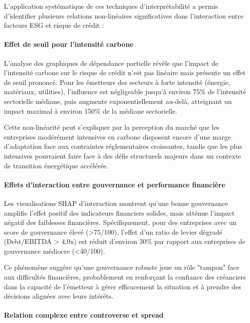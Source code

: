 L'application systématique de ces techniques d'interprétabilité a permis d'identifier plusieurs relations non-linéaires significatives dans l'interaction entre facteurs ESG et risque de crédit :

\paragraph{Effet de seuil pour l'intensité carbone} 

L'analyse des graphiques de dépendance partielle révèle que l'impact de l'intensité carbone sur le risque de crédit n'est pas linéaire mais présente un effet de seuil prononcé. Pour les émetteurs des secteurs à forte intensité (énergie, matériaux, utilities), l'influence est négligeable jusqu'à environ 75\% de l'intensité sectorielle médiane, puis augmente exponentiellement au-delà, atteignant un impact maximal à environ 150\% de la médiane sectorielle.

Cette non-linéarité peut s'expliquer par la perception du marché que les entreprises modérément intensives en carbone disposent encore d'une marge d'adaptation face aux contraintes réglementaires croissantes, tandis que les plus intensives pourraient faire face à des défis structurels majeurs dans un contexte de transition énergétique accélérée.

\paragraph{Effets d'interaction entre gouvernance et performance financière} 

Les visualisations SHAP d'interaction montrent qu'une bonne gouvernance amplifie l'effet positif des indicateurs financiers solides, mais atténue l'impact négatif des faiblesses financières. Spécifiquement, pour des entreprises avec un score de gouvernance élevé (>75/100), l'effet d'un ratio de levier dégradé (Debt/EBITDA > 4,0x) est réduit d'environ 30\% par rapport aux entreprises de gouvernance médiocre (<40/100).

Ce phénomène suggère qu'une gouvernance robuste joue un rôle "tampon" face aux difficultés financières, probablement en renforçant la confiance des créanciers dans la capacité de l'émetteur à gérer efficacement la situation et à prendre des décisions alignées avec leurs intérêts.

\paragraph{Relation complexe entre controverse et spread} 

